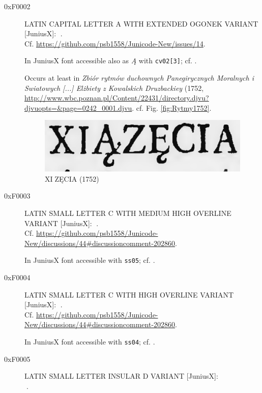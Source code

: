\documentclass{article}
\newcommand{\Jglyph}[1]{{\relsize{2}\J#1}}
\begin{document}
\begin{description}
\item [0xF0002] LATIN CAPITAL LETTER A WITH EXTENDED OGONEK VARIANT [JuniusX]: 
  \Jglyph{󰀂}.\\ Cf. \url{https://github.com/psb1558/Junicode-New/issues/14}.

  In JuniusX font accessible also as \textit{Ą} with \texttt{cv02[3]};
  cf. \autocite[p. 7]{baker20:_opent_featur_junius_junius}.


  Occurs at least in \textit{Zbiór rytmów duchownych Panegirycznych
    Moralnych i Swiatowych [...] Elżbiety z Kowalskich Druzbackiey}
  (1752,
  \url{http://www.wbc.poznan.pl/Content/22431/directory.djvu?djvuopts=&page=0242_0001.djvu}.
  cf. Fig. \vref{fig:Rytmy1752}.

  \begin{figure}[h]
    \includegraphics{img/00487576ksiazecia}
    \caption{{\J XI󰀂ZĘCIA} (1752)}
    \label{fig:Rytmy1752}
  \end{figure}
  
\item [0xF0003] LATIN SMALL LETTER C WITH MEDIUM HIGH OVERLINE VARIANT [JuniusX]: 
  \Jglyph{󰀃}.\\ Cf. \url{https://github.com/psb1558/Junicode-New/discussions/44#discussioncomment-202860}.

    In JuniusX font accessible  with \texttt{ss05};
  cf. \autocite[p. 7]{baker20:_opent_featur_junius_junius}.

  
\item [0xF0004] LATIN SMALL LETTER C WITH HIGH OVERLINE VARIANT [JuniusX]: 
  \Jglyph{󰀄}.\\ Cf. \url{https://github.com/psb1558/Junicode-New/discussions/44#discussioncomment-202860}.

  In JuniusX font accessible  with \texttt{ss04};
  cf. \autocite[p. 6]{baker20:_opent_featur_junius_junius}.

\item [0xF0005] LATIN SMALL LETTER INSULAR D VARIANT [JuniusX]:\\
  \Jglyph{󰀅}.%


\end{description}
\end{document}

